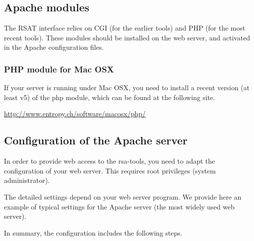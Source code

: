 \documentclass[12pt,a4paper, twoside]{scrreprt} %
\begin{document}
\subsection{Apache modules}

The RSAT interface relies on CGI (for the earlier tools) and PHP (for
the most recent tools). These modules should be installed on the web
server, and activated in the Apache configuration files. 

\subsubsection{PHP module for Mac OSX}

If your server is running under Mac OSX, you need to install a recent
version (at least v5) of the php module, which can be found at the following site. 

\url{http://www.entropy.ch/software/macosx/php/}

\subsection{Configuration of the Apache server}

In order to provide web access to the rsa-tools, you need to adapt the
configuration of your web server. This requires root privileges
(system administrator). 


The detailed settings depend on your web server program. We provide
here an example of typical settings for the Apache server (the most
widely used web server).

In summary, the configuration includes the following steps.
\end{document}
